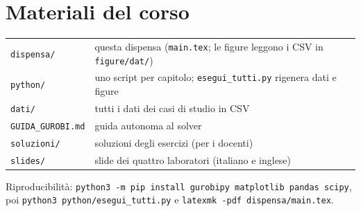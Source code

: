 \section{Materiali del corso}

\begin{center}\small
\begin{tabular}{lp{8.6cm}}
\toprule
\texttt{dispensa/} & questa dispensa (\texttt{main.tex}; le figure leggono i CSV in
\texttt{figure/dat/}) \\
\texttt{python/} & uno script per capitolo; \texttt{esegui\_tutti.py} rigenera
dati e figure \\
\texttt{dati/} & tutti i dati dei casi di studio in CSV \\
\texttt{GUIDA\_GUROBI.md} & guida autonoma al solver \\
\texttt{soluzioni/} & soluzioni degli esercizi (per i docenti) \\
\texttt{slides/} & slide dei quattro laboratori (italiano e inglese) \\
\bottomrule
\end{tabular}
\end{center}

Riproducibilità: \texttt{python3 -m pip install gurobipy matplotlib pandas scipy},
poi \texttt{python3 python/esegui\_tutti.py} e \texttt{latexmk -pdf dispensa/main.tex}.
